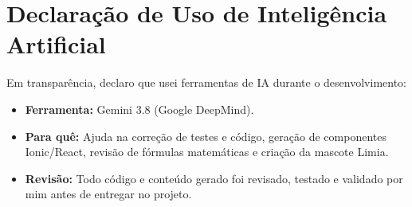 \documentclass[12pt, a4paper]{article}
\begin{document}
\section{Declara\c{c}\~{a}o de Uso de Intelig\^{e}ncia Artificial}
Em transpar\^{e}ncia, declaro que usei ferramentas de IA durante o desenvolvimento:
\begin{itemize}
    \item \textbf{Ferramenta:} Gemini 3.8 (Google DeepMind).
    \item \textbf{Para qu\^{e}:} Ajuda na corre\c{c}\~{a}o de testes e c\'{o}digo, gera\c{c}\~{a}o de componentes Ionic/React, revis\~{a}o de f\'{o}rmulas matem\'{a}ticas e cria\c{c}\~{a}o da mascote Limia.
    \item \textbf{Revis\~{a}o:} Todo c\'{o}digo e conte\'{u}do gerado foi revisado, testado e validado por mim antes de entregar no projeto.
\end{itemize}
\end{document}
